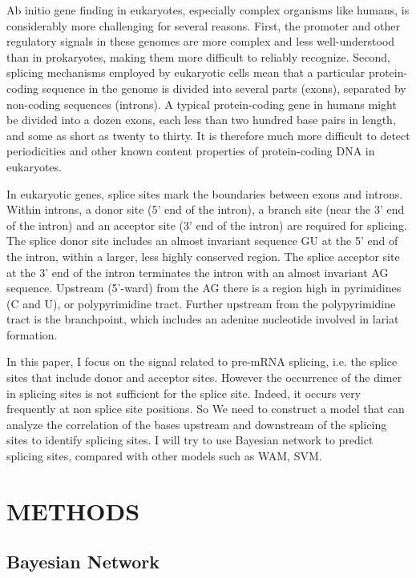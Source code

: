 \documentclass{gapd}
\begin{document}
Ab initio gene finding in eukaryotes, especially complex organisms like
humans, is considerably more challenging for several reasons. First, the
promoter and other regulatory signals in these genomes are more complex
and less well-understood than in prokaryotes, making them more difficult
to reliably recognize. Second, splicing mechanisms employed by
eukaryotic cells mean that a particular protein-coding sequence in the
genome is divided into several parts (exons), separated by non-coding
sequences (introns). A typical protein-coding gene in humans might be
divided into a dozen exons, each less than two hundred base pairs in
length, and some as short as twenty to thirty. It is therefore much more
difficult to detect periodicities and other known content properties of
protein-coding DNA in eukaryotes.

In eukaryotic genes, splice sites mark the boundaries between exons and
introns. Within introns, a donor site (5' end of the intron), a branch
site (near the 3' end of the intron) and an acceptor site (3' end of the
intron) are required for splicing. The splice donor site includes an
almost invariant sequence GU at the 5' end of the intron, within a
larger, less highly conserved region. The splice acceptor site at the 3'
end of the intron terminates the intron with an almost invariant AG
sequence. Upstream (5'-ward) from the AG there is a region high in
pyrimidines (C and U), or polypyrimidine tract. Further upstream from
the polypyrimidine tract is the branchpoint, which includes an adenine
nucleotide involved in lariat formation.

In this paper, I focus on the signal related to pre-mRNA splicing, i.e.
the splice sites that include donor and acceptor sites. However the
occurrence of the dimer in splicing sites is not sufficient for the
splice site. Indeed, it occurs very frequently at non splice site
positions. So We need to construct a model that can analyze the
correlation of the bases upstream and downstream of the splicing sites
to identify splicing sites. I will try to use Bayesian network to
predict splicing sites, compared with other models such as WAM, SVM.

\section{METHODS}\label{methods}

\subsection{Bayesian Network}\label{bayesian-network}
\end{document}
